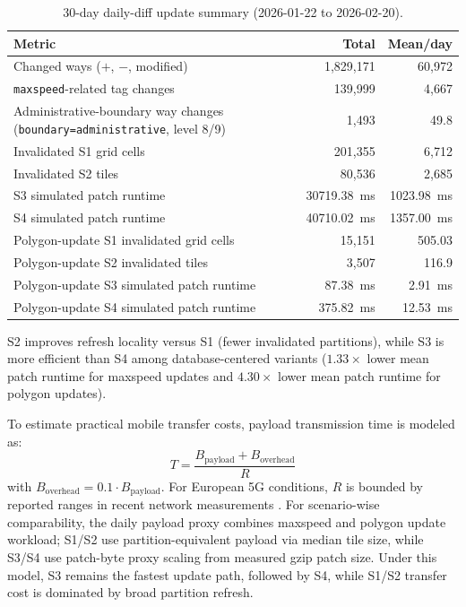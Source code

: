 \documentclass[conference]{IEEEtran}
\begin{document}
\begin{table}[!t]
\caption{30-day daily-diff update summary (2026-01-22 to 2026-02-20).}
\label{tab:update_summary}
\centering
\begin{tabular}{p{4.8cm}rr}
\toprule
Metric & Total & Mean/day \\
\midrule
Changed ways (\(+\), \(-\), modified) & 1{,}829{,}171 & 60{,}972 \\
\texttt{maxspeed}-related tag changes & 139{,}999 & 4{,}667 \\
Administrative-boundary way changes (\texttt{boundary=administrative}, level 8/9) & 1{,}493 & 49.8 \\
Invalidated S1 grid cells & 201{,}355 & 6{,}712 \\
Invalidated S2 tiles & 80{,}536 & 2{,}685 \\
S3 simulated patch runtime & \SI{30719.38}{ms} & \SI{1023.98}{ms} \\
S4 simulated patch runtime & \SI{40710.02}{ms} & \SI{1357.00}{ms} \\
Polygon-update S1 invalidated grid cells & 15{,}151 & 505.03 \\
Polygon-update S2 invalidated tiles & 3{,}507 & 116.9 \\
Polygon-update S3 simulated patch runtime & \SI{87.38}{ms} & \SI{2.91}{ms} \\
Polygon-update S4 simulated patch runtime & \SI{375.82}{ms} & \SI{12.53}{ms} \\
\bottomrule
\end{tabular}
\end{table}

S2 improves refresh locality versus S1 (fewer invalidated partitions), while S3 is more efficient than S4 among database-centered variants (\(1.33\times\) lower mean patch runtime for maxspeed updates and \(4.30\times\) lower mean patch runtime for polygon updates).

To estimate practical mobile transfer costs, payload transmission time is modeled as:
\begin{equation}
T=\frac{B_{\text{payload}}+B_{\text{overhead}}}{R}
\end{equation}
with \(B_{\text{overhead}}=0.1 \cdot B_{\text{payload}}\). For European 5G conditions, \(R\) is bounded by reported ranges in recent network measurements \cite{opensignal_europe_5g_2024,eu_connectivity_impact_2026}. For scenario-wise comparability, the daily payload proxy combines maxspeed and polygon update workload; S1/S2 use partition-equivalent payload via median tile size, while S3/S4 use patch-byte proxy scaling from measured gzip patch size. Under this model, S3 remains the fastest update path, followed by S4, while S1/S2 transfer cost is dominated by broad partition refresh.
\end{document}
